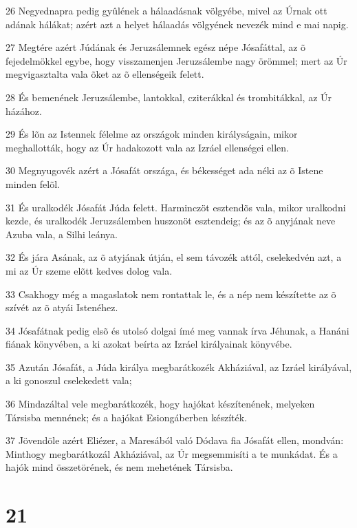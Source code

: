 \par 26 Negyednapra pedig gyûlének a hálaadásnak völgyébe, mivel az Úrnak ott adának hálákat; azért azt a helyet hálaadás völgyének nevezék mind e mai napig.
\par 27 Megtére azért Júdának és Jeruzsálemnek egész népe Jósafáttal, az õ fejedelmökkel egybe, hogy visszamenjen Jeruzsálembe nagy örömmel; mert az Úr megvigasztalta vala õket az õ ellenségeik felett.
\par 28 És bemenének Jeruzsálembe, lantokkal, cziterákkal és trombitákkal, az Úr házához.
\par 29 És lõn az Istennek félelme az országok minden királyságain, mikor meghallották, hogy az Úr hadakozott vala az Izráel ellenségei ellen.
\par 30 Megnyugovék azért a Jósafát országa, és békességet ada néki az õ Istene minden felõl.
\par 31 És uralkodék Jósafát Júda felett. Harminczöt esztendõs vala, mikor uralkodni kezde, és uralkodék Jeruzsálemben huszonöt esztendeig; és az õ anyjának neve Azuba vala, a Silhi leánya.
\par 32 És jára Asának, az õ atyjának útján, el sem távozék attól, cselekedvén azt, a mi az Úr szeme elõtt kedves dolog vala.
\par 33 Csakhogy még a magaslatok nem rontattak le, és a nép nem készítette az õ szívét az õ atyái Istenéhez.
\par 34 Jósafátnak pedig elsõ és utolsó dolgai ímé meg vannak írva Jéhunak, a Hanáni fiának könyvében, a ki azokat beírta az Izráel királyainak könyvébe.
\par 35 Azután Jósafát, a Júda királya megbarátkozék Akháziával, az Izráel királyával, a ki gonoszul cselekedett vala;
\par 36 Mindazáltal vele megbarátkozék, hogy hajókat készítenének, melyeken Társisba mennének; és a hajókat Esiongáberben készíték.
\par 37 Jövendöle azért Eliézer, a Maresából való Dódava fia Jósafát ellen, mondván: Minthogy megbarátkozál Akháziával, az Úr megsemmisíti a te munkádat. És a hajók mind összetörének, és nem mehetének Társisba.

\chapter{21}

